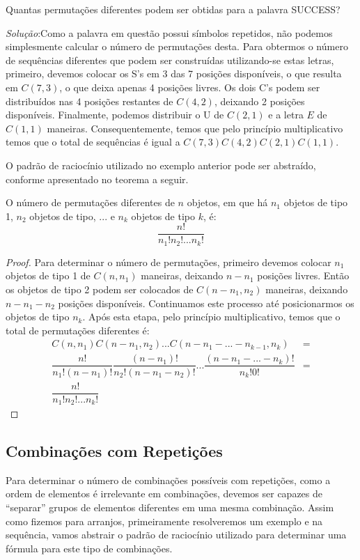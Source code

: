 \begin{Example}
Quantas permutações diferentes podem ser obtidas para a palavra
SUCCESS?

\textit{Solução}:Como a palavra em questão possui símbolos repetidos,
não podemos simplesmente calcular o número de permutações desta. Para
obtermos o número de sequências diferentes que podem ser construídas
utilizando-se estas letras, primeiro, devemos colocar os S's em 3 das
7 posições disponíveis, o que resulta em $C(7,3)$, o que deixa apenas
4 posições livres. Os dois C's podem ser distribuídos nas 4 posições
restantes de $C(4,2)$, deixando 2 posições disponíveis. Finalmente,
podemos distribuir o U de $C(2,1)$ e a letra $E$ de $C(1,1)$ maneiras.
Consequentemente, temos que pelo princípio multiplicativo temos que o
total de sequências é igual a $C(7,3)C(4,2)C(2,1)C(1,1)$.
\end{Example}
O padrão de raciocínio utilizado no exemplo anterior pode ser
abstraído, conforme apresentado no teorema a seguir.
\begin{Theorem}
O número de permutações diferentes de $n$ objetos, em que há $n_1$
objetos de tipo 1, $n_2$ objetos de tipo, ... e $n_k$ objetos de tipo
$k$, é:
\[
\dfrac{n!}{n_1!n_2!...n_k!}
\]
\end{Theorem}
\begin{proof}
Para determinar o número de permutações, primeiro devemos colocar
$n_1$ objetos de tipo 1 de $C(n,n_1)$ maneiras, deixando $n - n_1$
posições livres. Então os objetos de tipo 2 podem ser colocados de
$C(n - n_1,n_2)$ maneiras, deixando $n - n_1 - n_2$ posições
disponíveis. Continuamos este processo até posicionarmos os objetos de
tipo $n_k$. Após esta etapa, pelo princípio multiplicativo, temos que
o total de permutações diferentes é:
\[
\begin{array}{lc}
C(n,n_1) C(n - n_1, n_2) ... C(n - n_1 - ... - n_{k - 1},n_k) & = \\
\dfrac{n!}{n_1!(n - n_1)!}\dfrac{(n- n_1)!}{n_2!(n - n_1 - n_2)!}
... \dfrac{(n - n_1 - ... -n_k)!}{n_k! 0!} & = \\
\dfrac{n!}{n_1!n_2!...n_k!}
\end{array}
\]
\end{proof}

\subsection{Combinações com Repetições}

Para determinar o número de combinações possíveis com repetições, como
a ordem de elementos é irrelevante em combinações, devemos ser capazes
de ``separar'' grupos de elementos diferentes em uma mesma combinação.
Assim como fizemos para arranjos, primeiramente resolveremos um
exemplo e na sequência, vamos abstrair o padrão de raciocínio
utilizado para determinar uma fórmula para este tipo de combinações.

